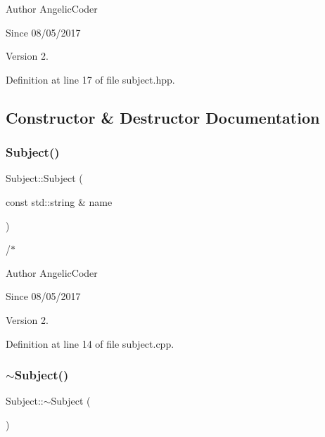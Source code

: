 \begin{DoxyAuthor}{Author}
Angelic\+Coder 
\end{DoxyAuthor}
\begin{DoxySince}{Since}
08/05/2017 
\end{DoxySince}
\begin{DoxyVersion}{Version}
2. 
\end{DoxyVersion}


Definition at line 17 of file subject.\+hpp.



\subsection{Constructor \& Destructor Documentation}
\mbox{\label{class_subject_aadd211855155af3c49b6907520d77675}} 
\subsubsection{\texorpdfstring{Subject()}{Subject()}}
{\footnotesize\ttfamily Subject\+::\+Subject (\begin{DoxyParamCaption}\item[{const std\+::string \&}]{name }\end{DoxyParamCaption})}



/$\ast$ 

\begin{DoxyAuthor}{Author}
Angelic\+Coder 
\end{DoxyAuthor}
\begin{DoxySince}{Since}
08/05/2017 
\end{DoxySince}
\begin{DoxyVersion}{Version}
2. 
\end{DoxyVersion}


Definition at line 14 of file subject.\+cpp.

\mbox{\label{class_subject_a7c4f522850f718466e5be7eb55ba1969}} 
\subsubsection{\texorpdfstring{$\sim$\+Subject()}{~Subject()}}
{\footnotesize\ttfamily Subject\+::$\sim$\+Subject (\begin{DoxyParamCaption}{ }\end{DoxyParamCaption})}



